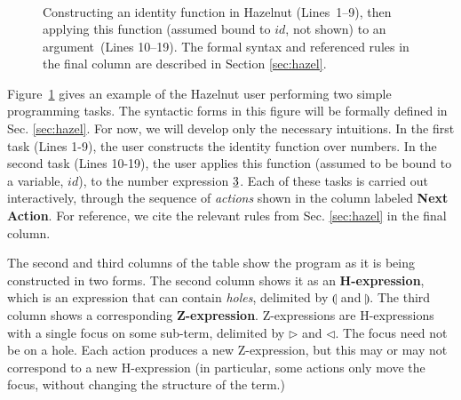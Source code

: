 \documentclass{llncs}
\begin{document}
\begin{figure}[t]
\[\begin{array}{|c||c|c||l|l|}
\end{array}
\]
\caption{Constructing an identity function in Hazelnut (Lines~1--9), then  applying this function (assumed bound to $id$, not shown) to an argument~(Lines 10--19). The formal syntax and referenced rules in the final column are described in Section \ref{sec:hazel}.}
\label{fig:first-example}
\end{figure}
%
Figure~\ref{fig:first-example} gives an example of the Hazelnut user
performing two simple programming tasks.
The syntactic forms in this figure will be formally defined in Sec. \ref{sec:hazel}. For now, we will develop only the necessary intuitions. In the first task (Lines 1-9), the user constructs the identity function over numbers. In the second task (Lines 10-19), the user applies this function (assumed to be bound to a variable, $id$), to the number expression $\underline{3}$.
Each of these tasks is carried out interactively, through the sequence of \emph{actions} shown in the  column labeled \textbf{Next Action}. For reference, we cite the relevant rules from Sec. \ref{sec:hazel} in the final column.

The second and third columns of the
table show the program as it is being constructed in two forms. The second column shows it as an \textbf{H-expression}, which is an expression that can contain \emph{holes}, delimited by $\llparenthesis$ and $\rrparenthesis$. The third column shows a corresponding \textbf{Z-expression}. Z-expressions are H-expressions with a single focus on some sub-term, delimited by $\triangleright$ and $\triangleleft$. The focus need not be on a hole.
Each action produces a new Z-expression, but this may or may not correspond to a new H-expression (in particular, some actions only move the focus, without changing the structure of the term.)
\end{document}
